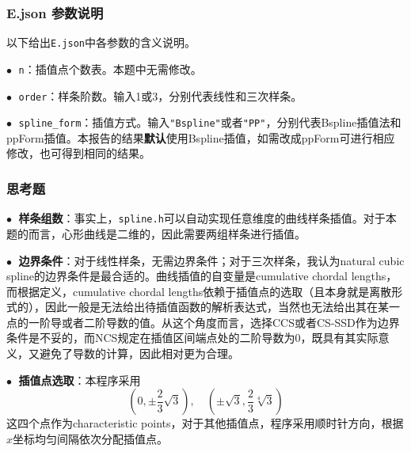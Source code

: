 \documentclass{ctexart}
\begin{document}
\begin{sloppypar}
\subsubsection{E.json 参数说明}
以下给出\verb|E.json|中各参数的含义说明。

$\bullet \;$ \verb|n|：插值点个数表。本题中无需修改。

$\bullet \;$ \verb|order|：样条阶数。输入1或3，分别代表线性和三次样条。

$\bullet \;$ \verb|spline_form|：插值方式。输入\verb|"Bspline"|或者\verb|"PP"|，分别代表Bspline插值法和ppForm插值。本报告的结果\textbf{默认}使用Bspline插值，如需改成ppForm可进行相应修改，也可得到相同的结果。

\subsubsection{思考题}
$\bullet \;$ \textbf{样条组数}：事实上，\verb|spline.h|可以自动实现任意维度的曲线样条插值。对于本题的而言，心形曲线是二维的，因此需要两组样条进行插值。

$\bullet \;$ \textbf{边界条件}：对于线性样条，无需边界条件；对于三次样条，我认为natural cubic spline的边界条件是最合适的。曲线插值的自变量是cumulative chordal lengths，而根据定义，cumulative chordal lengths依赖于插值点的选取（且本身就是离散形式的），因此一般是无法给出待插值函数的解析表达式，当然也无法给出其在某一点的一阶导或者二阶导数的值。从这个角度而言，选择CCS或者CS-SSD作为边界条件是不妥的，而NCS规定在插值区间端点处的二阶导数为0，既具有其实际意义，又避免了导数的计算，因此相对更为合理。

$\bullet \;$ \textbf{插值点选取}：本程序采用
\begin{equation}
    (0,\pm\frac{2}{3}\sqrt{3}),\quad(\pm\sqrt{3},\frac{2}{3}\sqrt[4]{3})
\end{equation}
这四个点作为characteristic points，对于其他插值点，程序采用顺时针方向，根据$x$坐标均匀间隔依次分配插值点。


\end{sloppypar}
\end{document}
